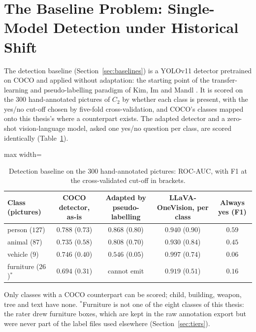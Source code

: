 \documentclass[12pt,a4paper]{report}
\begin{document}
\section{The Baseline Problem: Single-Model Detection under Historical Shift}
\label{sec:baseline_problem}
The detection baseline (Section~\ref{sec:baselines}) is a YOLOv11 detector pretrained on COCO and applied without adaptation: the starting point of the transfer-learning and pseudo-labelling paradigm of Kim, Im and Mandl \cite{kim2024historical_od}. It is scored on the $300$ hand-annotated pictures of $C_2$ by whether each class is present, with the yes/no cut-off chosen by five-fold cross-validation, and COCO's classes mapped onto this thesis's where a counterpart exists. The adapted detector and a zero-shot vision-language model, asked one yes/no question per class, are scored identically (Table~\ref{tab:detection_baseline}).

\begin{table}[!htbp]
\centering
\small
\caption[Detection baseline on the 300 hand-annotated pictures]{Detection baseline on the $300$ hand-annotated pictures: ROC-AUC, with F1 at the cross-validated cut-off in brackets.}
\label{tab:detection_baseline}
\begin{adjustbox}{max width=\linewidth}
\begin{tabular}{lcccc}
\toprule
Class (pictures) & COCO detector, as-is & Adapted by pseudo-labelling & LLaVA-OneVision, per class & Always yes (F1) \\
\midrule
person ($127$) & $0.788$ ($0.73$) & $0.868$ ($0.80$) & $0.940$ ($0.90$) & $0.59$ \\
animal ($87$) & $0.735$ ($0.58$) & $0.808$ ($0.70$) & $0.930$ ($0.84$) & $0.45$ \\
vehicle ($9$) & $0.746$ ($0.40$) & $0.546$ ($0.05$) & $0.997$ ($0.74$) & $0.06$ \\
furniture ($26$)$^{*}$ & $0.694$ ($0.31$) & cannot emit & $0.919$ ($0.51$) & $0.16$ \\
\bottomrule
\end{tabular}
\end{adjustbox}
\par\smallskip\footnotesize Only classes with a COCO counterpart can be scored; child, building, weapon, tree and text have none. $^{*}$Furniture is not one of the eight classes of this thesis: the rater drew furniture boxes, which are kept in the raw annotation export but were never part of the label files used elsewhere (Section~\ref{sec:tiers}).
\end{table}
\end{document}
